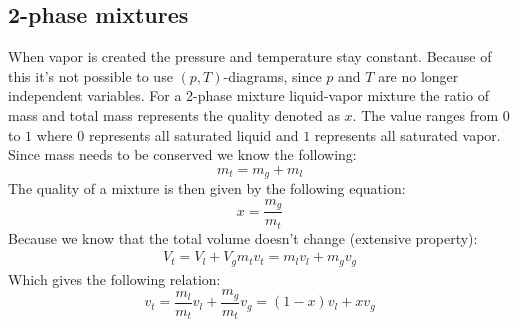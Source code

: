 \documentclass[11pt, a4paper]{article}
\begin{document}
\subsection{2-phase mixtures}
When vapor is created the pressure and temperature stay constant. Because of this it's not possible to use $(p, T)$-diagrams, since $p$ and $T$ are no longer independent variables. For a 2-phase mixture liquid-vapor mixture the ratio of mass and total mass represents the quality denoted as $x$. The value ranges from $0$ to $1$ where $0$ represents all saturated liquid and $1$ represents all saturated vapor. Since mass needs to be conserved we know the following:
\begin{equation}
  m_{t} = m_g + m_l
\end{equation}
The quality of a mixture is then given by the following equation:
\begin{equation}
  x = \frac{m_g}{m_{t}}
\end{equation}
Because we know that the total volume doesn't change (extensive property):
\begin{gather}
  V_{t} = V_l + V_g
  m_{t}v_{t} = m_lv_l + m_gv_g
\end{gather}
Which gives the following relation:
\begin{equation}
  v_t = \frac{m_l}{m_{t}}v_l + \frac{m_g}{m_{t}} v_g = (1 - x)v_l + xv_g
\end{equation}
\end{document}
